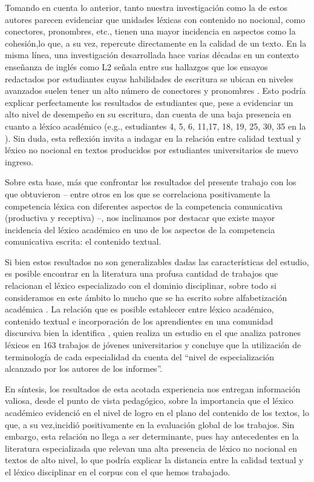\documentclass{textolivre}
\begin{document}
Tomando en cuenta lo anterior, tanto nuestra investigación como la de
estos autores parecen evidenciar que unidades léxicas con contenido no nocional,
como conectores, pronombres, etc., tienen una mayor incidencia en aspectos como
la cohesión,lo que, a su vez, repercute directamente en la calidad de un texto.
En la misma línea, una investigación desarrollada hace varias décadas en un
contexto enseñanza de inglés como L2 señala entre sus hallazgos que los ensayos
redactados por estudiantes cuyas habilidades de escritura se ubican en niveles
avanzados suelen tener un alto número de conectores y pronombres \cite{Reid1992}.
Esto podría explicar perfectamente los resultados de estudiantes que, pese a
evidenciar un alto nivel de desempeño en su escritura, dan cuenta de una baja
presencia en cuanto a léxico académico (e.g., estudiantes 4, 5, 6, 11,17, 18,
19, 25, 30, 35 en la ). Sin duda, esta reflexión invita a indagar en
la relación entre calidad textual y léxico no nocional en textos producidos por
estudiantes universitarios de nuevo ingreso.

Sobre esta base, más que confrontar los resultados del presente trabajo con
los que obtuvieron \textcite{RiffoOcares2014,Giammatteo2003,GonzaloZapico2016,Wood2019}
– entre otros en los que se
correlaciona positivamente la competencia léxica con diferentes aspectos de la
competencia comunicativa (productiva y receptiva) –, nos inclinamos por destacar
que existe mayor incidencia del léxico académico en uno de los aspectos de la
competencia comunicativa escrita: el contenido textual.

Si bien estos resultados no son generalizables dadas las características
del estudio, es posible encontrar en la literatura una profusa cantidad de
trabajos que relacionan el léxico especializado con el dominio disciplinar,
sobre todo si consideramos en este ámbito lo mucho que se ha escrito sobre
alfabetización académica \cite{cantis2013,Baker2019,Kse2019}.
La relación que es posible establecer entre léxico académico, contenido
textual e incorporación de los aprendientes en una comunidad discursiva bien la
identifica \textcite[p. 55]{acevedo2006}, quien realiza un estudio en el que analiza
patrones léxicos en 163 trabajos de jóvenes universitarios y concluye que la
utilización de terminología de cada especialidad da cuenta del “nivel
de especialización alcanzado por los autores de los informes”.

En síntesis, los resultados de esta acotada experiencia nos entregan
información valiosa, desde el punto de vista pedagógico, sobre la importancia
que el léxico académico evidenció en el nivel de logro en el plano del
contenido de los textos, lo que, a su vez,incidió positivamente en la
evaluación global de los trabajos. Sin embargo, esta relación no llega a ser
determinante, pues hay antecedentes en la literatura especializada que relevan
una alta presencia de léxico no nocional en textos de alto nivel, lo que
podría explicar la distancia entre la calidad textual y el léxico disciplinar en
el corpus con el que hemos trabajado.
\end{document}
